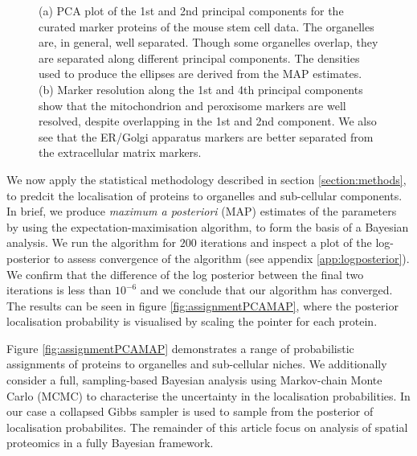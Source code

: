 \documentclass[12pt,english]{article}
\begin{document}
\begin{figure}[ht]
\begin{subfigure}[t]{0.5\textwidth}
        \caption{}
\end{subfigure}
  \centering
  \caption{ (a) PCA plot of the 1st and 2nd principal components for
    the curated marker proteins of the mouse stem cell data. The organelles
    are, in general, well separated. Though some organelles
    overlap, they are separated along different principal
    components. The densities used to produce the ellipses
    are derived from the MAP estimates. (b) Marker
    resolution along the 1st and 4th principal
    components show that the mitochondrion and peroxisome
    markers are well resolved, despite overlapping in the 1st and 2nd component.
    We also see that the ER/Golgi
        apparatus markers are better separated from the
    extracellular matrix markers.}
\label{figure::pcaellipse}
\end{figure}


\clearpage



We now apply the statistical methodology described in section \ref{section:methods},
to predcit the localisation of proteins to organelles and sub-cellular components.
In brief, we produce \textit{maximum a posteriori} (MAP) estimates of the parameters by using the expectation-maximisation
algorithm, to form the basis of a Bayesian analysis.
We run the algorithm for $200$ iterations and inspect a plot of the
log-posterior to assess convergence of the algorithm (see appendix \ref{app:logposterior}). We confirm
that the difference of the log posterior between the final two iterations is less than $10^{-6}$
and we conclude that our algorithm has converged. The results can be seen in figure
\ref{fig:assignmentPCAMAP}, where the posterior localisation probability is visualised by scaling the pointer
for each protein.

Figure \ref{fig:assignmentPCAMAP} demonstrates a range of probabilistic
assignments of proteins to organelles and sub-cellular niches. We additionally
consider a full, sampling-based Bayesian analysis using Markov-chain Monte Carlo
(MCMC) to characterise the uncertainty in the localisation probabilities.
In our case a collapsed Gibbs sampler is used
to sample from the posterior of localisation probabilites. The remainder of this
article focus on analysis of spatial proteomics in a fully Bayesian framework.
\end{document}
